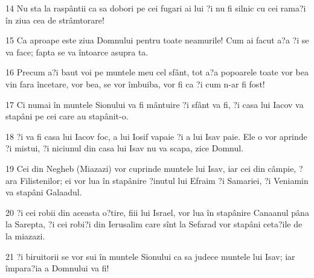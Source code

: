 \par 14 Nu sta la raspântii ca sa dobori pe cei fugari ai lui ?i nu fi silnic cu cei rama?i în ziua cea de strâmtorare!
\par 15 Ca aproape este ziua Domnului pentru toate neamurile! Cum ai facut a?a ?i se va face; fapta se va întoarce asupra ta.
\par 16 Precum a?i baut voi pe muntele meu cel sfânt, tot a?a popoarele toate vor bea vin fara încetare, vor bea, se vor îmbuiba, vor fi ca ?i cum n-ar fi fost!
\par 17 Ci numai în muntele Sionului va fi mântuire ?i sfânt va fi, ?i casa lui Iacov va stapâni pe cei care au stapânit-o.
\par 18 ?i va fi casa lui Iacov foc, a lui Iosif vapaie ?i a lui Isav paie. Ele o vor aprinde ?i mistui, ?i niciunul din casa lui Isav nu va scapa, zice Domnul.
\par 19 Cei din Negheb (Miazazi) vor cuprinde muntele lui Isav, iar cei din câmpie, ?ara Filistenilor; ei vor lua în stapânire ?inutul lui Efraim ?i Samariei, ?i Veniamin va stapâni Galaadul.
\par 20 ?i cei robii din aceasta o?tire, fiii lui Israel, vor lua în stapânire Canaanul pâna la Sarepta, ?i cei robi?i din Ierusalim care sînt la Sefarad vor stapâni ceta?ile de la miazazi.
\par 21 ?i biruitorii se vor sui în muntele Sionului ca sa judece muntele lui Isav; iar împara?ia a Domnului va fi!


